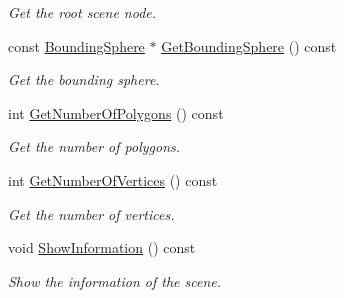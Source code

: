 \begin{DoxyCompactItemize}
\begin{DoxyCompactList}\small\item\em Get the root scene node. \end{DoxyCompactList}\item 
const \hyperlink{class_bounding_sphere}{Bounding\+Sphere} $\ast$ \hyperlink{class_scene_aea4c84671689a7f137b295a20a906b4a}{Get\+Bounding\+Sphere} () const 
\begin{DoxyCompactList}\small\item\em Get the bounding sphere. \end{DoxyCompactList}\item 
int \hyperlink{class_scene_a91693a196849a5e4cf0e76b3544f5706}{Get\+Number\+Of\+Polygons} () const 
\begin{DoxyCompactList}\small\item\em Get the number of polygons. \end{DoxyCompactList}\item 
int \hyperlink{class_scene_ab71588ebd8c5ec59745edef28cf63873}{Get\+Number\+Of\+Vertices} () const 
\begin{DoxyCompactList}\small\item\em Get the number of vertices. \end{DoxyCompactList}\item 
void \hyperlink{class_scene_ad096283dfe60231b51703b768fb57753}{Show\+Information} () const 
\begin{DoxyCompactList}\small\item\em Show the information of the scene. \end{DoxyCompactList}\end{DoxyCompactItemize}
